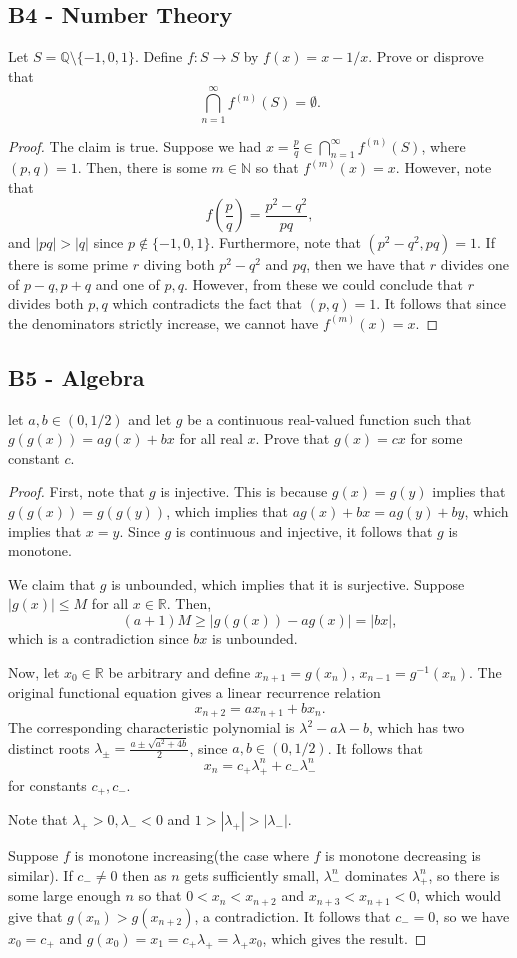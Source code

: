 \documentclass[11pt]{scrartcl}
\newcommand{\N}{\mathbb{N}}
\newcommand{\Q}{\mathbb{Q}}
\newcommand{\R}{\mathbb{R}}
\newcommand{\<}{\langle}
\renewcommand{\>}{\rangle}
\begin{document}
\subsection{B4 - Number Theory}
 Let $S = \Q \setminus\{-1, 0, 1\}$.  Define $f: S \to S$ by $f(x) = x - 1/x$.  Prove or disprove that 
$$\bigcap_{n=1}^\infty f^{(n)}(S) = \emptyset.$$
\begin{proof}
The claim is true.  Suppose we had $x = \frac{p}{q} \in \bigcap_{n=1}^\infty f^{(n)}(S)$, where $(p, q) = 1$.  Then, there is some $m \in \N$ so that $f^{(m)}(x) = x$.  However, note that 
$$f\left(\frac{p}{q} \right) = \frac{p^2 - q^2}{pq},$$
and $|pq| > |q|$ since $p \not \in \{-1, 0, 1\}$.  Furthermore, note that $(p^2 - q^2, pq) = 1$.  If there is some prime $r$ diving both $p^2 - q^2$ and $pq$, then we have that $r$ divides one of $p-q, p+q$ and one of $p, q$.  However, from these we could conclude that $r$ divides both $p, q$ which contradicts the fact that $(p, q) = 1$.  It follows that since the denominators strictly increase, we cannot have $f^{(m)}(x) = x$.
\end{proof}
\pagebreak
\subsection{B5 - Algebra}
let $a, b \in (0, 1/2)$ and let $g$ be a continuous real-valued function such that $g(g(x)) = ag(x) + bx$ for all real $x$.  Prove that $g(x) = cx$ for some constant $c$.
\begin{proof}
First, note that $g$ is injective.  This is because $g(x) = g(y)$ implies that $g(g(x)) = g(g(y))$, which implies that $ag(x) + bx = ag(y) + by$, which implies that $x = y$.   Since $g$ is continuous and injective, it follows that $g$ is monotone. 

We claim that $g$ is unbounded, which implies that it is surjective.  Suppose $|g(x)| \le M$ for all $x \in \R$.  Then, 
$$(a+1)M \ge |g(g(x)) - ag(x)| = |bx|,$$
which is a contradiction since $bx$ is unbounded.  

Now, let $x_0 \in \R$ be arbitrary and define $x_{n+1} = g(x_n)$, $x_{n-1} = g^{-1}(x_n)$.  The original functional equation gives a linear recurrence relation
$$x_{n+2} = ax_{n+1} + bx_n.$$
The corresponding characteristic polynomial is $\lambda^2 - a\lambda - b$, which has two distinct roots $\lambda_{\pm} = \frac{a \pm \sqrt{a^2 + 4b}}{2}$, since $a, b \in (0, 1/2)$.   It follows that 
$$x_n = c_+ \lambda_+^n + c_- \lambda_-^n$$
for constants $c_+, c_-$.

Note that $\lambda_+ > 0, \lambda_- < 0$ and $1 > |\lambda_+| > |\lambda_-|$.  

Suppose $f$ is monotone increasing(the case where $f$ is monotone decreasing is similar).  If $c_- \ne 0$ then as $n$ gets sufficiently small, $\lambda_-^n$ dominates $\lambda_+^n$, so there is some large enough $n$ so that $0 < x_n < x_{n+2}$ and $x_{n+3} < x_{n+1} < 0$, which would give that $g(x_n) > g(x_{n+2})$, a contradiction.  It follows that $c_- = 0$, so we have $x_0 = c_+$ and $g(x_0) = x_1 =  c_+ \lambda_+ = \lambda_+ x_0$, which gives the result.  


\end{proof}
\pagebreak
\end{document}
